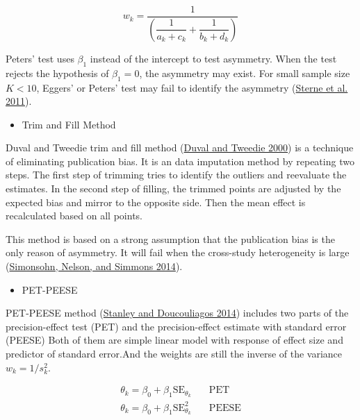 \documentclass[
  11pt,
  openany]{memoir}
\providecommand{\tightlist}{%
  \setlength{\itemsep}{0pt}\setlength{\parskip}{0pt}}
\begin{document}
\begin{equation}
w_k = \frac{1}{\left(\dfrac{1}{a_k+c_k}+\dfrac{1}{b_k+d_k}\right)}
\end{equation}

Peters' test uses \(\beta_1\) instead of the intercept to test asymmetry. When the test rejects the hypothesis of \(\beta_1 = 0\), the asymmetry may exist.
For small sample size \(K<10\), Eggers' or Peters' test may fail to identify the asymmetry (\protect\hyperlink{ref-sterneRecommendationsExaminingInterpreting2011}{Sterne et al. 2011}).

\begin{itemize}
\tightlist
\item
  Trim and Fill Method
\end{itemize}

Duval and Tweedie trim and fill method (\protect\hyperlink{ref-duvalTrimFillSimple2000}{Duval and Tweedie 2000}) is a technique of eliminating publication bias.
It is an data imputation method by repeating two steps. The first step of trimming tries to identify the outliers and reevaluate the estimates. In the second step of filling, the trimmed points are adjusted by the expected bias and mirror to the opposite side. Then the mean effect is recalculated based on all points.

This method is based on a strong assumption that the publication bias is the only reason of asymmetry.
It will fail when the cross-study heterogeneity is large (\protect\hyperlink{ref-simonsohnPcurveKeyFiledrawer2014}{Simonsohn, Nelson, and Simmons 2014}).

\begin{itemize}
\tightlist
\item
  PET-PEESE
\end{itemize}

PET-PEESE method (\protect\hyperlink{ref-stanleyMetaregressionApproximationsReduce2014}{Stanley and Doucouliagos 2014}) includes two parts of the precision-effect test (PET) and the precision-effect estimate with standard error (PEESE)
Both of them are simple linear model with response of effect size and predictor of standard error.And the weights are still the inverse of the variance \(w_k= 1/s_k^2\).

\begin{equation}
\begin{split}
\theta_k = \beta_0 + \beta_1\mathrm{SE}_{\theta_k} &\quad \text{PET}\\
\theta_k = \beta_0 + \beta_1\mathrm{SE}_{\theta_k}^2 &\quad \text{PEESE}
\end{split}
\label{eq:pet-peese}
\end{equation}
\end{document}
